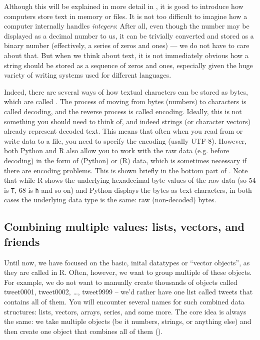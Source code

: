 Although this will be explained in more detail in ,
it is good to introduce how computers store text in memory or files. 
It is not too difficult to imagine how a computer internally
handles \emph{integers}: After all, even though the number may be displayed
as a decimal number to us, it can be trivially converted and stored
as a binary number (effectively, a series of zeros and ones)
--- we do not have to care about that.
But when we think about text, it is not
immediately obvious how a string should be stored as a sequence of
zeros and ones, especially given the huge variety of writing systems used for different languages. 

Indeed, there are several ways of how textual characters can be stored as bytes,
which are called . 
The process of moving from bytes (numbers) to characters is called decoding,
and the reverse process is called encoding. 
Ideally, this is not something you should need to think of,
and indeed strings (or character vectors) already represent decoded text.
This means that often when you read from or write data to a file,
you need to specify the encoding (usally UTF-8). 
However, both Python and R also allow you to work with the raw data
(e.g. before decoding) in the form of  (Python) or  (R) data,
which is sometimes necessary if there are encoding problems.
This is shown briefly in the bottom part of .
Note that while R shows the underlying hexadecimal byte values of the raw data (so 54 is \verb|T|, 68 is \verb|h| and so on) and Python displays the bytes as text characters, in both cases the underlying data type is the same: raw (non-decoded) bytes.



\subsection{Combining multiple values: lists, vectors, and friends}

Until now, we have focused on the basic, inital datatypes or ``vector
objects'', as they are called in R.  Often, however, we want to group
multiple of these objects. For example, we do not want to manually
create thousands of objects called tweet0001, tweet0002, \ldots,
tweet9999 -- we'd rather have one list called tweets that contains all
of them. You will encounter several names for such combined data
structures: lists, vectors, arrays, series, and some
more. 
The core idea is always the same: we take multiple objects
(be it numbers, strings, or anything else) and then create one object that combines all of them ().

